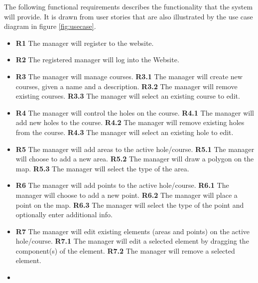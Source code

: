 \documentclass{article}
\begin{document}
    The following functional requirements describes the functionality that the
    system will provide. It is drawn from user stories that are also
    illustrated by the use case diagram in figure \ref{fig:usecase}.

    \begin{itemize}
        \item
            \textbf{R1} The manager will register to the website.
        \item
            \textbf{R2} The registered manager will log into the Website.
        \item
            \textbf{R3} The manager will manage courses.
            \subitem \textbf{R3.1} The manager will create new courses, given a
            name and a description.
            \subitem \textbf{R3.2} The manager will remove existing courses.
            \subitem \textbf{R3.3} The manager will select an existing course
            to edit.
        \item
            \textbf{R4} The manager will control the holes on the course.
            \subitem \textbf{R4.1} The manager will add new holes to the
            course.
            \subitem \textbf{R4.2} The manager will remove existing holes from
            the course.
            \subitem \textbf{R4.3} The manager will select an existing hole to
            edit.
        \item
            \textbf{R5} The manager will add areas to the active hole/course.
            \subitem \textbf{R5.1} The manager will choose to add a new area.
            \subitem \textbf{R5.2} The manager will draw a polygon on the map.
            \subitem \textbf{R5.3} The manager will select the type of the
            area.
        \item
            \textbf{R6} The manager will add points to the active hole/course.
            \subitem \textbf{R6.1} The manager will choose to add a new point.
            \subitem \textbf{R6.2} The manager will place a point on the map.
            \subitem \textbf{R6.3} The manager will select the type of the
            point and optionally enter additional info.
        \item
            \textbf{R7} The manager will edit existing elements (areas and
            points) on the active hole/course.
            \subitem \textbf{R7.1} The manager will edit a selected element by
            dragging the component(s) of the element.
            \subitem \textbf{R7.2} The manager will remove a selected element.
        \item

\end{itemize}
\end{document}
